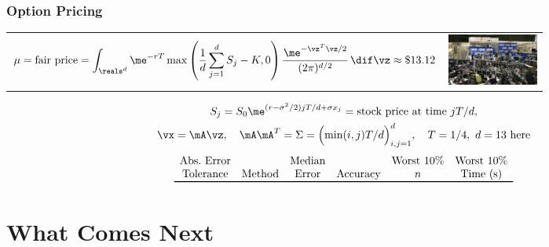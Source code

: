 \documentclass[10pt,compress,xcolor={usenames,dvipsnames},aspectratio=169]{beamer} %
\renewcommand{\mSigma}{\Sigma}
\newcommand{\financePict}{\href{http://i2.cdn.turner.com/money/dam/assets/130611131918-chicago-board-options-exchange-1024x576.jpg}{\includegraphics[width
		= 
		3cm]{Programs/130611131918-chicago-board-options-exchange-1024x576.jpg}}}
\begin{document}
\begin{frame}
\frametitle{ Option Pricing}
\vspace{-10ex}
\begin{tabular}{m{11cm}m{2.5cm}}
	\[
	\begin{aligned}
	\mu= \text{fair price} = 
	\int_{\reals^d}\me^{-r T}\max\left(\frac{1}{d}\sum_{j=1}^d S_{j}-K, 0\right) 
	\frac{\me^{-\vz^T\vz/2}}{(2\pi)^{d/2}}\,\dif \vz \approx \$13.12
	\end{aligned}
	\]
	& 
	\financePict
\end{tabular}
\vspace{-4ex}
\begin{gather*}
S_{j} =  S_0\me^{(r-\sigma^2/2)jT/d+\sigma x_j} = \text{stock price at time } 
jT/d, \\
\vx  = \mA \vz, \quad \mA \mA^T = \mSigma = \Bigl ( \min(i,j) T/d \Bigr) _{i,j = 1}^d,
\quad T = 1/4, \ d=13 \text{ here}
\end{gather*}
\begin{equation*}
\begin{array}{cccccccc}
\text{Abs.\ Error}& & & \text{Median}&& \text{Worst 10\%} & \text{Worst 10\%} \\
\text{Tolerance} & \multicolumn{2}{c}{\text{Method}}  & \text{Error} & \text{Accuracy} 
& n & \text{Time (s)} \\
\toprule

\end{array}
\end{equation*}
\vspace{-8ex}

\end{frame}

\section{What Comes Next}
\end{document}
